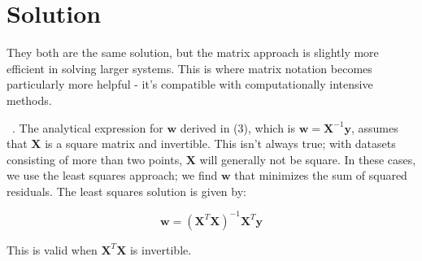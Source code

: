 \documentclass{harvardml}
\theoremstyle{definition}
\theoremstyle{plain}
\newenvironment{solution}
  {\color{blue}\section*{Solution}}
{}
\begin{document}
\begin{solution}
They both are the same solution, but the matrix approach is slightly more efficient in solving larger systems. This is where matrix notation becomes particularly more helpful - it's compatible with computationally intensive methods. 

\ . The analytical expression for \( \mathbf{w} \) derived in (3), which is \( \mathbf{w} = \mathbf{X}^{-1}\mathbf{y} \), assumes that \( \mathbf{X} \) is a square matrix and invertible. This isn't always true; with datasets consisting of more than two points, \( \mathbf{X} \) will generally not be square. In these cases, we use the least squares approach; we find \( \mathbf{w} \) that minimizes the sum of squared residuals. The least squares solution is given by:

\[
\mathbf{w} = (\mathbf{X}^T\mathbf{X})^{-1}\mathbf{X}^T\mathbf{y}
\]

This is valid when \( \mathbf{X}^T\mathbf{X} \) is invertible.
 
\end{solution}

\color{black}
\newpage
\end{document}
